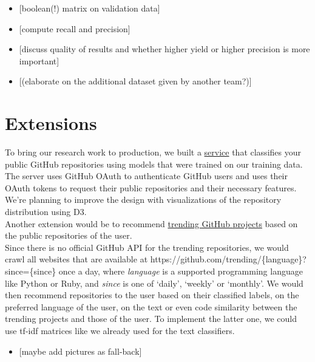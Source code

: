 \documentclass{article}
\providecommand{\tightlist}{%
  \setlength{\itemsep}{0pt}\setlength{\parskip}{0pt}}
\begin{document}
\begin{itemize}
\tightlist
\item
  {[}boolean(!) matrix on validation data{]}
\item
  {[}compute recall and precision{]}
\item
  {[}discuss quality of results and whether higher yield or higher
  precision is more important{]}
\item
  {[}(elaborate on the additional dataset given by another team?){]}
\end{itemize}

\section{Extensions}\label{extensions}

To bring our research work to production, we built a
\href{https://git-better.herokuapp.com/}{service} that classifies your
public GitHub repositories using models that were trained on our
training data. The server uses GitHub OAuth to authenticate GitHub users
and uses their OAuth tokens to request their public repositories and
their necessary features. We're planning to improve the design with
visualizations of the repository distribution using D3.\\
Another extension would be to recommend
\href{https://github.com/trending}{trending GitHub projects} based on
the public repositories of the user.\\
Since there is no official GitHub API for the trending repositories, we
would crawl all websites that are available at
https://github.com/trending/\{language\}?since=\{since\} once a day,
where \emph{language} is a supported programming language like Python or
Ruby, and \emph{since} is one of `daily', `weekly' or `monthly'. We
would then recommend repositories to the user based on their classified
labels, on the preferred language of the user, on the text or even code
similarity between the trending projects and those of the user. To
implement the latter one, we could use tf-idf matrices like we already
used for the text classifiers.

\begin{itemize}
\tightlist
\item
  {[}maybe add pictures as fall-back{]}
\end{itemize}
\end{document}
